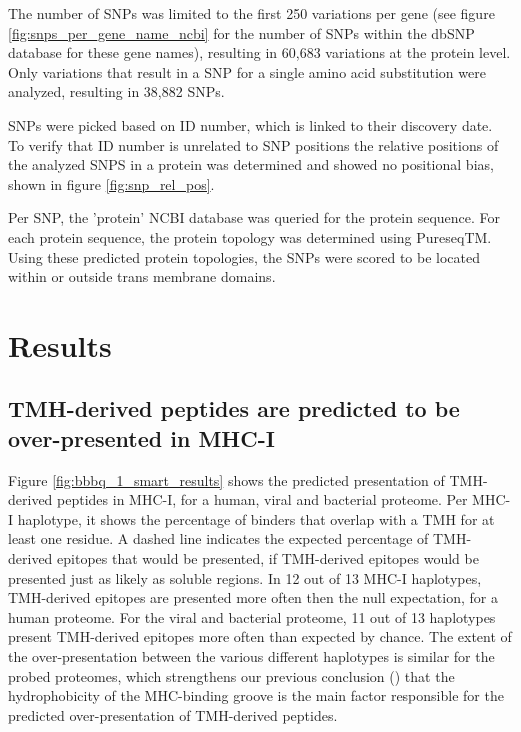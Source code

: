 The number of SNPs
was limited to the first 250 variations per gene (see figure
\ref{fig:snps_per_gene_name_ncbi} for the number of SNPs
within the dbSNP database for these gene names),
resulting in 60,683 variations at the protein level.
Only variations that result in a SNP for
a single amino acid substitution were analyzed, resulting in 38,882 SNPs.

%
SNPs were picked based on ID number, which is linked to their discovery date. To verify that ID number is unrelated to SNP positions the relative positions of the analyzed SNPS in a protein was determined and showed no positional bias, shown in figure \ref{fig:snp_rel_pos}.

Per SNP, the 'protein' NCBI database was queried for the
protein sequence.
For each protein sequence, the protein topology was determined 
using PureseqTM.
Using these predicted protein topologies, the SNPs were scored to be located within or outside trans membrane domains.


\section{Results}

\subsection{TMH-derived peptides are predicted to be over-presented in MHC-I}

Figure \ref{fig:bbbq_1_smart_results} shows the predicted presentation of TMH-derived peptides in MHC-I,
for a human, viral and bacterial proteome.
Per MHC-I haplotype, it shows the percentage of binders that overlap with a TMH 
for at least one residue.
A dashed line indicates the expected percentage of TMH-derived epitopes 
that would be presented, if TMH-derived epitopes would be presented just as 
likely as soluble regions.
In 12 out of 13 MHC-I haplotypes, TMH-derived epitopes are presented more often 
then the null expectation, for a human proteome. 
For the viral and bacterial proteome, 11 out of 13 haplotypes present
TMH-derived epitopes more often than expected by chance.
The extent of the over-presentation between the various different haplotypes 
is similar for the probed proteomes, which strengthens our previous conclusion (\cite{bianchi2017}) that the hydrophobicity of the MHC-binding groove is the main factor responsible for the predicted over-presentation of TMH-derived peptides.  

